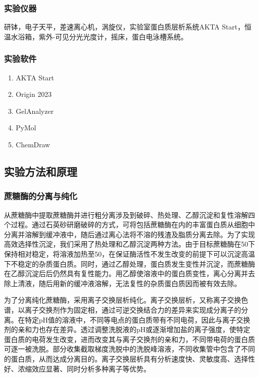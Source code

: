 \subsubsection{实验仪器}
研钵，电子天平，差速离心机，涡旋仪，实验室蛋白质层析系统AKTA Start，恒温水浴箱，紫外-可见分光光度计，摇床，蛋白电泳槽系统。

\subsubsection{实验软件}
\begin{enumerate}
    \item AKTA Start
    \item Origin 2023
    \item GelAnalyzer 
    \item PyMol
    \item ChemDraw 
\end{enumerate}

\subsection{实验方法和原理}

\subsubsection{蔗糖酶的分离与纯化}
从蔗糖酶中提取蔗糖酶并进行粗分离涉及到破碎、热处理、乙醇沉淀和复性溶解四个过程。通过石英砂研磨破碎的方式，可将包括蔗糖酶在内的丰富蛋白质从细胞中分离并溶解到缓冲液中，随后通过离心法将不溶的残渣及脂质分离去除。为了实现高效选择性沉淀，我们采用了热处理和乙醇沉淀两种方法。由于目标蔗糖酶在50\dc 下保持相对稳定，将溶液加热至50\dc ，在保证酶活性不发生改变的前提下可以沉淀高温下不稳定的杂质蛋白质。同时，通过乙醇处理，蛋白质发生变性并沉淀，而蔗糖酶在乙醇沉淀后后仍然具有复性能力。用乙醇使溶液中的蛋白质变性，离心分离并去除上清液，随后用新的缓冲液溶解，无法复性的杂质蛋白质因而被有效去除。

为了分离纯化蔗糖酶，采用离子交换层析纯化。离子交换层析，又称离子交换色谱，以离子交换剂作为固定相，通过可逆交换结合力的差异来实现成分离子的分离。在特定pH值的溶液中，不同等电点的蛋白质带有不同电荷，因此与离子交换剂的亲和力也存在差异。透过调整洗脱液的pH或逐渐增加盐的离子强度，使特定蛋白质的电荷发生改变，进而改变其与离子交换剂的亲和力，不同带电荷的蛋白质可逐一被洗脱。部分收集截取梯度洗脱中的洗脱峰溶液，不同收集管中包含了不同的蛋白质，从而达成分离目的。离子交换层析具有分析速度快、灵敏度高、选择性好、浓缩效应显著、同时分析多种离子等优势。

